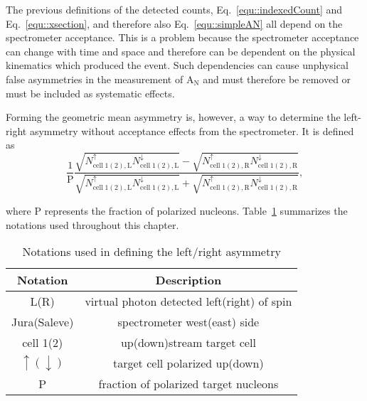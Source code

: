 The previous definitions of the detected counts, Eq.~\ref{equ::indexedCount}
and Eq.~\ref{equ::xsection}, and therefore also Eq.~\ref{equ::simpleAN} all
depend on the spectrometer acceptance.  This is a problem because the
spectrometer acceptance can change with time and space and therefore can be
dependent on the physical kinematics which produced the event.  Such
dependencies can cause unphysical false asymmetries in the measurement of
A$_{\mathrm{N}}$ and must therefore be removed or must be included as systematic
effects. \par

Forming the geometric mean asymmetry is, however, a way to determine the
left-right asymmetry without acceptance effects from the spectrometer.  It is
defined as
\begin{equation}
  \label{equ::ANgeomean}
  \frac{1}{\mathrm{P}}\frac{\sqrt{N_{\mathrm{cell\;1(2),
          L}}^{\uparrow}N_{\mathrm{cell\;1(2), L}}^{\downarrow}} -
    \sqrt{N_{\mathrm{cell\;1(2), R}}^{\uparrow}N_{\mathrm{cell\;1(2),
          R}}^{\downarrow}} }{\sqrt{N_{\mathrm{cell\;1(2),
          L}}^{\uparrow}N_{\mathrm{cell\;1(2), L}}^{\downarrow}} +
    \sqrt{N_{\mathrm{cell\;1(2), R}}^{\uparrow}N_{\mathrm{cell\;1(2),
          R}}^{\downarrow}} },
\end{equation}

\noindent
where P represents the fraction of polarized
nucleons. Table~\ref{tab::ANnotations} summarizes the notations used throughout
this chapter.

\begin{table}[h!t]
  \centering
  \label{tab::ANnotations}
  \caption{Notations used in defining the left/right asymmetry}
  \begin{tabular}{ |c|c| }
    \hline
    \textbf{Notation}& \textbf{Description} \\
    \hline

    L(R) & virtual photon detected left(right) of spin \\ \hline
    Jura(Saleve) & spectrometer west(east) side \\ \hline
    cell 1(2)& up(down)stream target cell \\ \hline
    $\uparrow(\downarrow)$ & target cell polarized up(down) \\ \hline
    P& fraction of polarized target nucleons \\ \hline
    
  \end{tabular}
\end{table}

